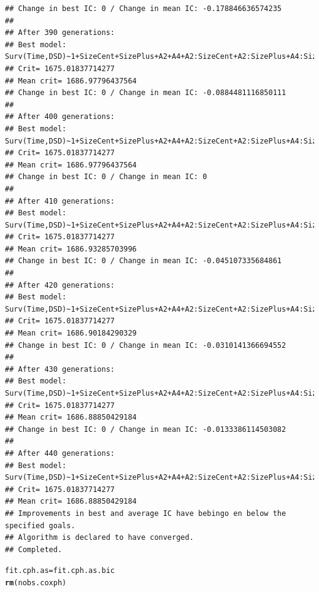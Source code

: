 \documentclass{article}\usepackage[]{graphicx}\usepackage[]{color}
\makeatletter
\newcommand{\hlstd}[1]{\textcolor[rgb]{0.345,0.345,0.345}{#1}}%
\newcommand{\hlkwb}[1]{\textcolor[rgb]{0.69,0.353,0.396}{#1}}%
\newcommand{\hlkwd}[1]{\textcolor[rgb]{0.737,0.353,0.396}{\textbf{#1}}}%
\newenvironment{kframe}{%
 \def\at@end@of@kframe{}%
 \ifinner\ifhmode%
  \def\at@end@of@kframe{\end{minipage}}%
  \begin{minipage}{\columnwidth}%
 \fi\fi%
 \def\FrameCommand##1{\hskip\@totalleftmargin \hskip-\fboxsep
 \colorbox{shadecolor}{##1}\hskip-\fboxsep
     \hskip-\linewidth \hskip-\@totalleftmargin \hskip\columnwidth}%
 \MakeFramed {\advance\hsize-\width
   \@totalleftmargin\z@ \linewidth\hsize
   \@setminipage}}%
 {\par\unskip\endMakeFramed%
 \at@end@of@kframe}
\newenvironment{knitrout}{}{} %
\makeatother
\begin{document}
\begin{knitrout}
\begin{kframe}
\begin{verbatim}
## Change in best IC: 0 / Change in mean IC: -0.178846636574235
## 
## After 390 generations:
## Best model: Surv(Time,DSD)~1+SizeCent+SizePlus+A2+A4+A2:SizeCent+A2:SizePlus+A4:SizePlus+A4:A2
## Crit= 1675.01837714277
## Mean crit= 1686.97796437564
## Change in best IC: 0 / Change in mean IC: -0.0884481116850111
## 
## After 400 generations:
## Best model: Surv(Time,DSD)~1+SizeCent+SizePlus+A2+A4+A2:SizeCent+A2:SizePlus+A4:SizePlus+A4:A2
## Crit= 1675.01837714277
## Mean crit= 1686.97796437564
## Change in best IC: 0 / Change in mean IC: 0
## 
## After 410 generations:
## Best model: Surv(Time,DSD)~1+SizeCent+SizePlus+A2+A4+A2:SizeCent+A2:SizePlus+A4:SizePlus+A4:A2
## Crit= 1675.01837714277
## Mean crit= 1686.93285703996
## Change in best IC: 0 / Change in mean IC: -0.045107335684861
## 
## After 420 generations:
## Best model: Surv(Time,DSD)~1+SizeCent+SizePlus+A2+A4+A2:SizeCent+A2:SizePlus+A4:SizePlus+A4:A2
## Crit= 1675.01837714277
## Mean crit= 1686.90184290329
## Change in best IC: 0 / Change in mean IC: -0.0310141366694552
## 
## After 430 generations:
## Best model: Surv(Time,DSD)~1+SizeCent+SizePlus+A2+A4+A2:SizeCent+A2:SizePlus+A4:SizePlus+A4:A2
## Crit= 1675.01837714277
## Mean crit= 1686.88850429184
## Change in best IC: 0 / Change in mean IC: -0.0133386114503082
## 
## After 440 generations:
## Best model: Surv(Time,DSD)~1+SizeCent+SizePlus+A2+A4+A2:SizeCent+A2:SizePlus+A4:SizePlus+A4:A2
## Crit= 1675.01837714277
## Mean crit= 1686.88850429184
## Improvements in best and average IC have bebingo en below the specified goals.
## Algorithm is declared to have converged.
## Completed.
\end{verbatim}
\begin{alltt}
\hlstd{fit.cph.as} \hlkwb{=} \hlstd{fit.cph.as.bic}
\hlkwd{rm}\hlstd{(nobs.coxph)}
\end{alltt}
\end{kframe}
\end{knitrout}
\end{document}
